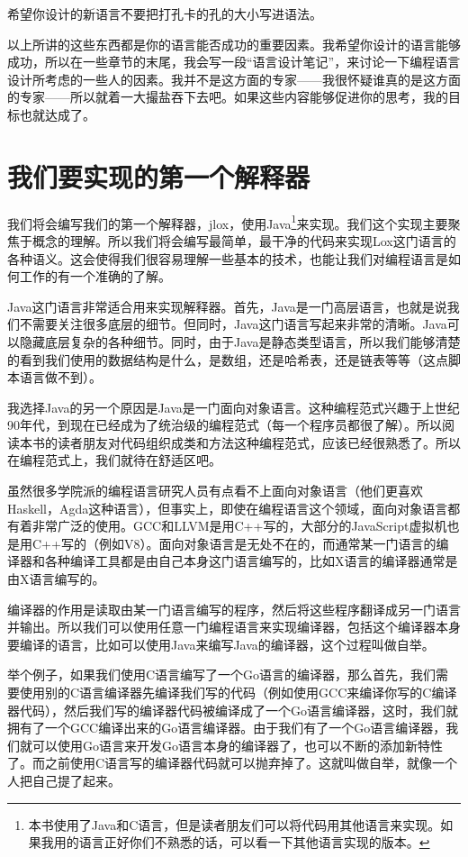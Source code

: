 \documentclass[cn,10pt,math=newtx,citestyle=gb7714-2015,bibstyle=gb7714-2015]{elegantbook}
\begin{document}
\begin{tcolorbox}
希望你设计的新语言不要把打孔卡的孔的大小写进语法。
\end{tcolorbox}

以上所讲的这些东西都是你的语言能否成功的重要因素。我希望你设计的语言能够成功，所以在一些章节的末尾，我会写一段“语言设计笔记”，来讨论一下编程语言设计所考虑的一些人的因素。我并不是这方面的专家——我很怀疑谁真的是这方面的专家——所以就着一大撮盐吞下去吧。如果这些内容能够促进你的思考，我的目标也就达成了。

\section{我们要实现的第一个解释器}

我们将会编写我们的第一个解释器，jlox，使用Java\footnote{本书使用了Java和C语言，但是读者朋友们可以将代码用其他语言来实现。如果我用的语言正好你们不熟悉的话，可以看一下其他语言实现的版本。}来实现。我们这个实现主要聚焦于概念的理解。所以我们将会编写最简单，最干净的代码来实现Lox这门语言的各种语义。这会使得我们很容易理解一些基本的技术，也能让我们对编程语言是如何工作的有一个准确的了解。

Java这门语言非常适合用来实现解释器。首先，Java是一门高层语言，也就是说我们不需要关注很多底层的细节。但同时，Java这门语言写起来非常的清晰。Java可以隐藏底层复杂的各种细节。同时，由于Java是静态类型语言，所以我们能够清楚的看到我们使用的数据结构是什么，是数组，还是哈希表，还是链表等等（这点脚本语言做不到）。

我选择Java的另一个原因是Java是一门面向对象语言。这种编程范式兴趣于上世纪90年代，到现在已经成为了统治级的编程范式（每一个程序员都很了解）。所以阅读本书的读者朋友对代码组织成类和方法这种编程范式，应该已经很熟悉了。所以在编程范式上，我们就待在舒适区吧。

虽然很多学院派的编程语言研究人员有点看不上面向对象语言（他们更喜欢Haskell，Agda这种语言），但事实上，即使在编程语言这个领域，面向对象语言都有着非常广泛的使用。GCC和LLVM是用C++写的，大部分的JavaScript虚拟机也是用C++写的（例如V8）。面向对象语言是无处不在的，而通常某一门语言的编译器和各种编译工具都是由自己本身这门语言编写的，比如X语言的编译器通常是由X语言编写的。

\begin{tcolorbox}
编译器的作用是读取由某一门语言编写的程序，然后将这些程序翻译成另一门语言并输出。所以我们可以使用任意一门编程语言来实现编译器，包括这个编译器本身要编译的语言，比如可以使用Java来编写Java的编译器，这个过程叫做自举。

举个例子，如果我们使用C语言编写了一个Go语言的编译器，那么首先，我们需要使用别的C语言编译器先编译我们写的代码（例如使用GCC来编译你写的C编译器代码），然后我们写的编译器代码被编译成了一个Go语言编译器，这时，我们就拥有了一个GCC编译出来的Go语言编译器。由于我们有了一个Go语言编译器，我们就可以使用Go语言来开发Go语言本身的编译器了，也可以不断的添加新特性了。而之前使用C语言写的编译器代码就可以抛弃掉了。这就叫做自举，就像一个人把自己提了起来。
\end{tcolorbox}
\end{document}
